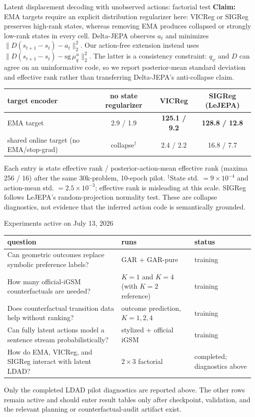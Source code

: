 \documentclass[aspectratio=169,10pt]{beamer}
\newcommand{\claim}[1]{\textcolor{cviolet}{\textbf{Claim:} #1}}
\newcommand{\sg}{\mathrm{sg}}
\begin{document}
\begin{frame}{Latent displacement decoding with unobserved actions: factorial test}
\claim{EMA targets require an explicit distribution regularizer here: VICReg
or SIGReg preserves high-rank states, whereas removing EMA produces collapsed
or strongly low-rank states in every cell.}
\small
Delta-JEPA observes $a_t$ and minimizes
$\|D(s_{t+1}-s_t)-a_t\|_2^2$. Our action-free extension instead uses
$\|D(s_{t+1}-s_t)-\sg\,\mu_q^u\|_2^2$. The latter is a consistency constraint:
$q_\psi$ and $D$ can agree on an uninformative code, so we report posterior-mean
standard deviation and effective rank rather than transferring Delta-JEPA's
anti-collapse claim.

\medskip
\centering
\begin{tabular}{lccc}
\toprule
target encoder & no state regularizer & VICReg & SIGReg (LeJEPA)\\
\midrule
EMA target & 2.9 / 1.9 & \textbf{125.1 / 9.2} & \textbf{128.8 / 12.8}\\
shared online target (no EMA/stop-grad) & collapse$^\dagger$ & 2.4 / 2.2 & 16.8 / 7.7\\
\bottomrule
\end{tabular}

\medskip
Each entry is state effective rank / posterior-action-mean effective rank
(maxima 256 / 16) after the same 30k-problem, 10-epoch pilot. $^\dagger$State
std. $=9\!\times\!10^{-4}$ and action-mean std. $=2.5\!\times\!10^{-3}$;
effective rank is misleading at this scale. SIGReg follows LeJEPA's
random-projection normality test. These are collapse diagnostics, not evidence
that the inferred action code is semantically grounded.
\end{frame}

\begin{frame}{Experiments active on July 13, 2026}
\small
\begin{tabular}{p{}p{}p{}}
\toprule
question & runs & status\\
\midrule
Can geometric outcomes replace symbolic preference labels? & GAR + GAR-pure & training\\
How many official-iGSM counterfactuals are needed? & $K=1$ and $K=4$ (with $K=2$ reference) & training\\
Does counterfactual transition data help without ranking? & outcome prediction, $K=1,2,4$ & training\\
Can fully latent actions model a sentence stream probabilistically? & stylized + official iGSM & training\\
How do EMA, VICReg, and SIGReg interact with latent LDAD? & $2\times3$ factorial & completed; diagnostics above\\
\bottomrule
\end{tabular}

\medskip
Only the completed LDAD pilot diagnostics are reported above. The other rows
remain active and should enter result tables only after checkpoint, validation,
and the relevant planning or counterfactual-audit artifact exist.
\end{frame}
\end{document}
